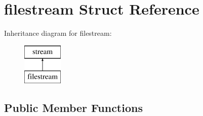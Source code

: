 \hypertarget{structfilestream}{}\section{filestream Struct Reference}
\label{structfilestream}
Inheritance diagram for filestream\+:\begin{figure}[H]
\begin{center}
\leavevmode
\includegraphics[height=2.000000cm]{structfilestream}
\end{center}
\end{figure}
\subsection*{Public Member Functions}
